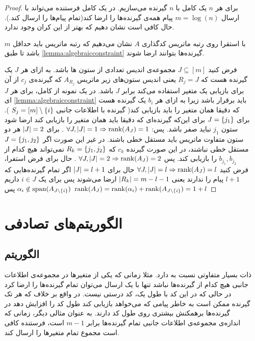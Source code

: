 \begin{proof}
	برای هر
	$n$
	یک 
	\lpicod
	کامل با
	$n$
	گیرنده می‌سازیم. در یک 
	\lpicod
	کامل فرستنده می‌تواند با ارسال
	$m = \log(n)$
	پیام همه‌ی گیرنده‌ها را ارضا کند(تمام پیام‌ها را ارسال کند.). حال کافی است نشان دهیم که بهتر از این کران وجود ندارد.
	
	با استقرا روی رتبه ماتریس کدگذاری 
	$A$
	نشان می‌دهیم که رتبه ماتریس باید حداقل 
	$m$
	باشد تا طبق
	\autoref{lemma:algebraicconstraint}
	گیرنده‌ها بتوانند ارضا شوند.
	
	فرض کنید
	$J \subseteq [m]$
	مجموعه‌ی اندیس تعدادی از ستون ها باشد. به ازای هر
	$J$
	یک گیرنده هست که 
	$R_j = J$
	یعنی اندیس ستون‌های زیر ماتریس
	$A_{R_j}$
	که گیرنده‌ی
	$c_j$
	از آن برای بازیابی یک متغیر استفاده می‌کند برابر
	$J$
	باشد. در یک نمونه از
	\lpicod
	کامل، برای هر
	$J$
	ای 
	\autoref{lemma:algebraicconstraint}
	باید برقرار باشد زیرا به ازای هر
	$b_i$
	یک گیرنده هست که دقیقا همان متغیر را باید بازیابی کند(
	گیرنده با اطلاعات جانبی
	$S_j = [m] \setminus \left\{ i \right\}$
	). برای
	$J = \left\{ j_1 \right\}$
	برای این‌که گیرنده‌ای که دقیقا باید همان متغیر را بازیابی کند ارضا شود ستون
	$j_1$
	نباید صفر باشد. پس: 
	$\forall J, \left|{J}\right| = 1 \Rightarrow \operatorname{rank}(A_J) = 1$
	. برای
	$\left|{J}\right| = 2$
	هر دو ستون متفاوت ماتریس باید مستقل خطی باشند. در غیر این صورت اگر
	$J = \left\{ j_1, j_2 \right\}$
	مستقل خطی نباشند، در این صورت گیرنده‌
	$c_k$
	که
	$R_k = \left\{ j_1, j_2 \right\}$
	نمی‌تواند هیچ کدام از 
	$b_{j_1}, b_{j_2}$
	را بازیابی کند. پس 
	$\forall J, \left|{J}\right| = 2 \Rightarrow \operatorname{rank}(A_J) = 2$
	. حال برای فرض استفرا، فرض کنید
	$\forall J, \left|{J}\right| = l \Rightarrow \operatorname{rank}(A_J) = l$
	حال برای
	$\left|{J}\right| = l + 1$
	اگر تمام گیرنده‌هایی که
	$l + 1$
	پیام را ندارند یعنی
	$\left|{R_k}\right| = m - l - 1 $
	ارضا می‌شوند پس برای یک
	$i \in J$
	داریم
	$\alpha_i \notin \operatorname{span}(A_{J \setminus \left\{ i \right\}})$
	پس
	$\operatorname{rank}(A_{J}) = \operatorname{rank}(\alpha_i) + \operatorname{rank}(A_{J \setminus \left\{ i \right\}}) = 1 + l$
\end{proof}
\section{الگوریتم‌های تصادفی}
\subsection{الگوریتم  }
\picod
ذات بسیار متفاوتی نسبت به
\icod
دارد. مثلا زمانی که یکی از متغیرها در مجموعه‌ی اطلاعات جانبی هیچ کدام از گیرنده‌ها نباشد تنها با یک ارسال می‌توان تمام گیرنده‌ها را ارضا کرد در حالی که در
\icod
این کد با طول یک، کد درستی نیست. در واقع بر خلاف
\icod
که هر تک گیرنده ممکن است به خاطر پیامی که می‌خواهد بازیابی کند طول کد را افزایش دهد در
\picod
گیرنده‌ها برهمکنش بیشتری روی طول کد دارند. به عنوان مثالی دیگر، زمانی که اندازه‌ی مجموعه‌ی اطلاعات جانبی تمام گیرنده‌ها برابر
$m - 1$
است، فرستنده کافی است مجموع تمام متغیرها را ارسال کند. 

